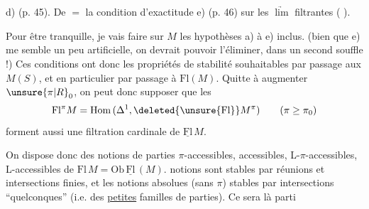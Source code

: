 %
%
 d) (p. 45). De $=$ la condition d'exactitude e) (p. 46) sur les $\underrightarrow{\lim}$ filtrantes (    ).

Pour être tranquille, je vais faire sur $M$ les hypothèses a) à e) inclus. (bien que e) me semble un peu artificielle, on devrait pouvoir l'éliminer, dans un second souffle !) Ces conditions ont donc les propriétés de stabilité souhaitables par passage aux $M(S)$, et en particulier par passage à $\mathrm{Fl}(M)$. Quitte à augmenter $\unsure{\pi|R}_0$, on peut donc supposer que les
\[
 \mathrm{Fl}^{\pi}M=\mathrm{Hom}\,(\Delta^1,\deleted{\unsure{\mathrm{Fl}}}M^{\pi})
 \qquad(\pi\geq\pi_0)
\]
forment aussi une filtration cardinale de $\underline{\mathrm{Fl}}\,M$. 

On dispose donc des notions de parties $\pi$-accessibles, accessibles, L-$\pi$-accessibles, L-accessibles de $\mathrm{Fl}\,M=\mathrm{Ob}\,\underline{\mathrm{Fl}}\,(M)$.   notions sont stables par réunions et intersections finies, et les notions absolues (sans $\pi$) stables par intersections ``quelconques'' (i.e.   des  \uline{petites} familles de parties). Ce sera là  parti%
